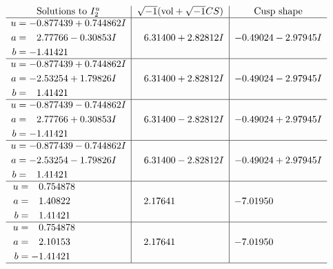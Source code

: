 \documentclass[1p]{elsarticle_modified}
\theoremstyle{definition}
\newcommand{\I}{\sqrt{-1}}
\begin{document}
$$\begin{array}{c|c|c}  
\text{Solutions to }I^u_{2}& \I (\text{vol} + \sqrt{-1}CS) & \text{Cusp shape}\\
 \hline 
\begin{aligned}
u &= -0.877439 + 0.744862 I \\
a &= \phantom{-}2.77766 - 0.30853 I \\
b &= -1.41421\phantom{ +0.000000I}\end{aligned}
 & \phantom{-}6.31400 + 2.82812 I & -0.49024 - 2.97945 I \\ \hline\begin{aligned}
u &= -0.877439 + 0.744862 I \\
a &= -2.53254 + 1.79826 I \\
b &= \phantom{-}1.41421\phantom{ +0.000000I}\end{aligned}
 & \phantom{-}6.31400 + 2.82812 I & -0.49024 - 2.97945 I \\ \hline\begin{aligned}
u &= -0.877439 - 0.744862 I \\
a &= \phantom{-}2.77766 + 0.30853 I \\
b &= -1.41421\phantom{ +0.000000I}\end{aligned}
 & \phantom{-}6.31400 - 2.82812 I & -0.49024 + 2.97945 I \\ \hline\begin{aligned}
u &= -0.877439 - 0.744862 I \\
a &= -2.53254 - 1.79826 I \\
b &= \phantom{-}1.41421\phantom{ +0.000000I}\end{aligned}
 & \phantom{-}6.31400 - 2.82812 I & -0.49024 + 2.97945 I \\ \hline\begin{aligned}
u &= \phantom{-}0.754878\phantom{ +0.000000I} \\
a &= \phantom{-}1.40822\phantom{ +0.000000I} \\
b &= \phantom{-}1.41421\phantom{ +0.000000I}\end{aligned}
 & \phantom{-}2.17641\phantom{ +0.000000I} & -7.01950\phantom{ +0.000000I} \\ \hline\begin{aligned}
u &= \phantom{-}0.754878\phantom{ +0.000000I} \\
a &= \phantom{-}2.10153\phantom{ +0.000000I} \\
b &= -1.41421\phantom{ +0.000000I}\end{aligned}
 & \phantom{-}2.17641\phantom{ +0.000000I} & -7.01950\phantom{ +0.000000I}\\
 \hline 
 \end{array}$$\newpage\newpage\renewcommand{\arraystretch}{1}
\end{document}
